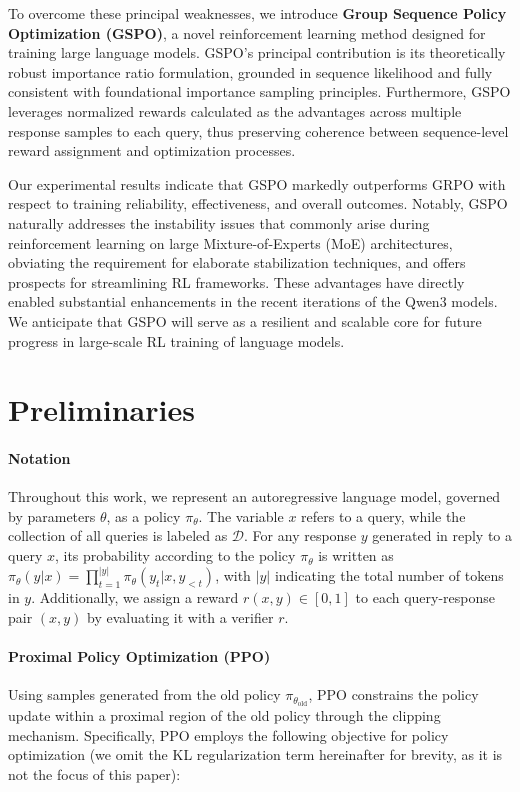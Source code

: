 To overcome these principal weaknesses, we introduce \textbf{Group Sequence Policy Optimization (GSPO)}, a novel reinforcement learning method designed for training large language models. GSPO’s principal contribution is its theoretically robust importance ratio formulation, grounded in sequence likelihood \citep{click} and fully consistent with foundational importance sampling principles. Furthermore, GSPO leverages normalized rewards calculated as the advantages across multiple response samples to each query, thus preserving coherence between sequence-level reward assignment and optimization processes.

Our experimental results indicate that GSPO markedly outperforms GRPO with respect to training reliability, effectiveness, and overall outcomes. Notably, GSPO naturally addresses the instability issues that commonly arise during reinforcement learning on large Mixture-of-Experts (MoE) architectures, obviating the requirement for elaborate stabilization techniques, and offers prospects for streamlining RL frameworks. These advantages have directly enabled substantial enhancements in the recent iterations of the Qwen3 models. We anticipate that GSPO will serve as a resilient and scalable core for future progress in large-scale RL training of language models.

\section{Preliminaries}

\paragraph{Notation}
Throughout this work, we represent an autoregressive language model, governed by parameters $\theta$, as a policy $\pi_\theta$. The variable $x$ refers to a query, while the collection of all queries is labeled as $\mathcal{D}$. For any response $y$ generated in reply to a query $x$, its probability according to the policy $\pi_\theta$ is written as $\pi_\theta (y | x)=\prod_{t=1}^{|y|} \pi_\theta (y_t | x, y_{<t} )$, with $|y|$ indicating the total number of tokens in $y$. Additionally, we assign a reward $r(x, y) \in [0, 1]$ to each query-response pair $(x, y)$ by evaluating it with a verifier $r$.

\paragraph{Proximal Policy Optimization (PPO)} Using samples generated from the old policy $\pi_{\theta_\text{old}}$, PPO \citep{ppo} constrains the policy update within a proximal region of the old policy through the clipping mechanism. Specifically, PPO employs the following objective for policy optimization (we omit the KL regularization term hereinafter for brevity, as it is not the focus of this paper):

